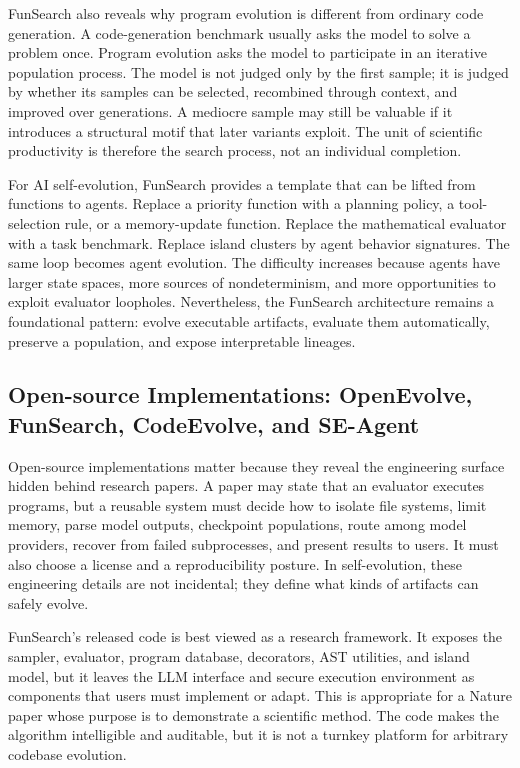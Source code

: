 FunSearch also reveals why program evolution is different from ordinary code generation.  A code-generation benchmark usually asks the model to solve a problem once.  Program evolution asks the model to participate in an iterative population process.  The model is not judged only by the first sample; it is judged by whether its samples can be selected, recombined through context, and improved over generations.  A mediocre sample may still be valuable if it introduces a structural motif that later variants exploit.  The unit of scientific productivity is therefore the search process, not an individual completion.

For AI self-evolution, FunSearch provides a template that can be lifted from functions to agents.  Replace a priority function with a planning policy, a tool-selection rule, or a memory-update function.  Replace the mathematical evaluator with a task benchmark.  Replace island clusters by agent behavior signatures.  The same loop becomes agent evolution.  The difficulty increases because agents have larger state spaces, more sources of nondeterminism, and more opportunities to exploit evaluator loopholes.  Nevertheless, the FunSearch architecture remains a foundational pattern: evolve executable artifacts, evaluate them automatically, preserve a population, and expose interpretable lineages.

\subsection{Open-source Implementations: OpenEvolve, FunSearch, CodeEvolve, and SE-Agent}
\label{subsec:open-source-implementations}

Open-source implementations matter because they reveal the engineering surface hidden behind research papers.  A paper may state that an evaluator executes programs, but a reusable system must decide how to isolate file systems, limit memory, parse model outputs, checkpoint populations, route among model providers, recover from failed subprocesses, and present results to users.  It must also choose a license and a reproducibility posture.  In self-evolution, these engineering details are not incidental; they define what kinds of artifacts can safely evolve.

FunSearch's released code is best viewed as a research framework.  It exposes the sampler, evaluator, program database, decorators, AST utilities, and island model, but it leaves the LLM interface and secure execution environment as components that users must implement or adapt.  This is appropriate for a Nature paper whose purpose is to demonstrate a scientific method.  The code makes the algorithm intelligible and auditable, but it is not a turnkey platform for arbitrary codebase evolution.

